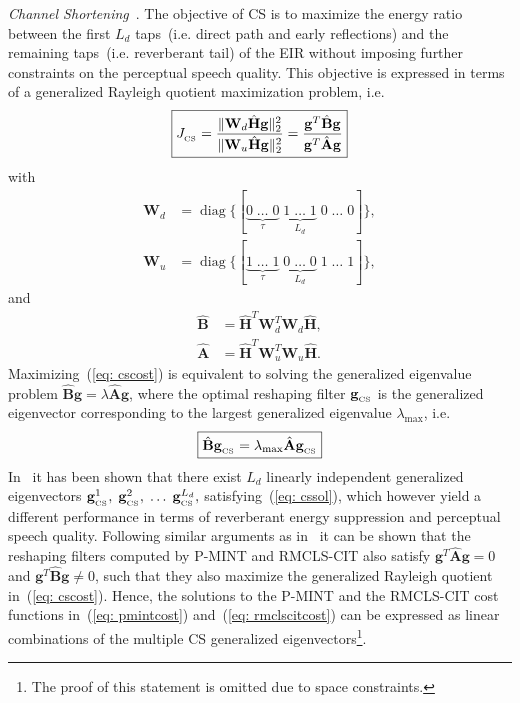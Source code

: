 \documentclass{article}
\DeclareMathOperator{\diag}{diag}
\begin{document}
\textit{Channel Shortening}~\cite{Zhang_IWAENC_2010, Kallinger_ICASSP_2006}. \enspace
The objective of CS is to maximize the energy ratio between the first $L_d$ taps~(i.e. direct path and early reflections) and the remaining taps~(i.e. reverberant tail) of the EIR without imposing further constraints on the perceptual speech quality.
This objective is expressed in terms of a generalized Rayleigh quotient maximization problem, i.e.
\begin{equation}
  \label{eq: cscost}
  \boxed{J_{_{\rm CS}} = \frac{\|\mathbf{W}_d \hat{\mathbf{H}}\mathbf{g} \|_2^2}{\|\mathbf{W}_u \hat{\mathbf{H}}\mathbf{g} \|_2^2} = \frac{\mathbf{g}^T\hat{\mathbf{B}}\mathbf{g}}{\mathbf{g}^T\hat{\mathbf{A}}\mathbf{g}}}
\end{equation}
with
\begin{align}
\label{eq: wincs}
\mathbf{W}_d & = {\diag} \{ [\underbrace{0 \; \ldots \; 0}_{\tau} \; \underbrace{1 \; \ldots \; 1}_{L_d}\; 0\; \ldots\; 0] \},  \\
\mathbf{W}_u & =  {\diag} \{ [\underbrace{1 \; \ldots \; 1}_{\tau} \; \underbrace{0 \; \ldots \; 0}_{L_d}\; 1\; \ldots\; 1] \},
\end{align}
and
\begin{align}
\hat{\mathbf{B}} & = \hat{\mathbf{H}}^{T} \mathbf{W}_d^T\mathbf{W}_d\hat{\mathbf{H}},  \\
\hat{\mathbf{A}} & = \hat{\mathbf{H}}^{T}\mathbf{W}_u^T\mathbf{W}_u \hat{\mathbf{H}}.
\end{align}
Maximizing~(\ref{eq: cscost}) is equivalent to solving the generalized eigenvalue problem $\hat{\mathbf{B}}\mathbf{g} = \lambda \hat{\mathbf{A}}\mathbf{g}$, where the optimal reshaping filter $\mathbf{g}_{_{\rm CS}}$ is the generalized eigenvector corresponding to the largest generalized eigenvalue $\lambda_{\max}$, i.e.
\begin{equation}
  \label{eq: cssol}
  \boxed{\hat{\mathbf{B}}\mathbf{g}_{_{\rm CS}} = \lambda_{\max}\hat{\mathbf{A}}\mathbf{g}_{_{\rm CS}}}
\end{equation}
In~\cite{Zhang_IWAENC_2010} it has been shown that there exist $L_d$ linearly independent generalized eigenvectors $\mathbf{g}_{_{\rm CS}}^1, \; \mathbf{g}_{_{\rm CS}}^2, \; \ldots \; \mathbf{g}_{_{\rm CS}}^{L_d},$ satisfying~(\ref{eq: cssol}), which however yield a different performance in terms of reverberant energy suppression and perceptual speech quality.
Following similar arguments as in~\cite{Zhang_IWAENC_2010} it can be shown that the reshaping filters computed by P-MINT and RMCLS-CIT also satisfy $\mathbf{g}^{T}\hat{\mathbf{A}}\mathbf{g} = 0$ and $\mathbf{g}^{T}\hat{\mathbf{B}}\mathbf{g} \neq 0$, such that they also maximize the generalized Rayleigh quotient in~(\ref{eq: cscost}).
Hence, the solutions to the P-MINT and the RMCLS-CIT cost functions in~(\ref{eq: pmintcost}) and~(\ref{eq: rmclscitcost}) can be expressed as linear combinations of the multiple CS generalized eigenvectors\footnote{The proof of this statement is omitted due to space constraints.}.
\end{document}

